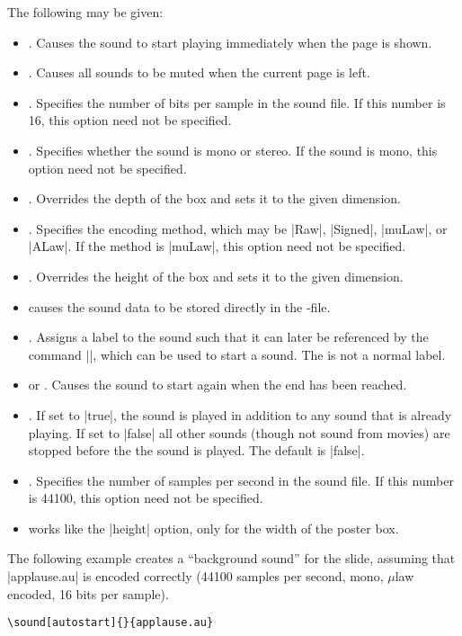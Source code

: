 \begin{command}{\sound{}}
  The following  may be given:
  \begin{itemize}
  \item
    . Causes the sound to start playing immediately
    when the page is shown.
  \item
    . Causes all sounds to be muted when the current
    page is left.
  \item
    . Specifies the number of
    bits per sample in the sound file. If this number is 16, this
    option need not be specified.
  \item
    . Specifies whether the sound is
    mono or stereo. If the sound is mono, this option need not be specified.
  \item
    . Overrides the depth of the
     box and sets it to the given dimension.
  \item
    . Specifies the encoding method,
    which may be |Raw|, |Signed|, |muLaw|, or |ALaw|. If the method is
    |muLaw|, this option need not be specified.
  \item
    . Overrides the height of the
     box and sets it to the given dimension.
  \item
     causes the sound data to be stored directly
    in the \pdf-file.
  \item
    . Assigns a label to the sound
    such that it can later be referenced by the command
    |\hyperlinksound|, which can be used to start a sound. The
     is not a normal label. 
  \item
     or . Causes the sound to start
    again when the end has been reached.
  \item
    . If set to |true|, the
    sound is played in addition to any sound that is already
    playing. If set to |false| all other sounds (though not sound from
    movies) are stopped before the the sound is played. The default is
    |false|. 
  \item
    . Specifies the number of
    samples per second in the sound file. If this number is 44100,
    this option need not be specified.
  \item
     works like the |height|
    option, only for the width of the poster box.
  \end{itemize}

  \example The following example creates a ``background sound'' for
  the slide, assuming that |applause.au| is encoded correctly (44100
  samples per second, mono, $\mu$law encoded, 16 bits per sample).
\begin{verbatim}
\sound[autostart]{}{applause.au}
\end{verbatim}
\end{command}

